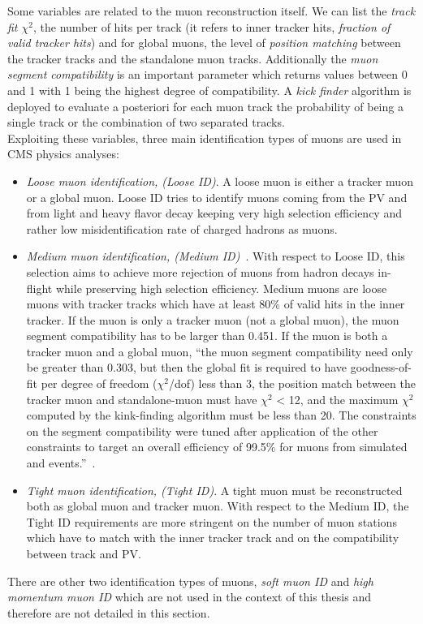 Some variables are related to the muon reconstruction itself. We can
list the \emph{track fit $\chi^2$}, the number of hits per track (it refers
to inner tracker hits, \emph{fraction of valid tracker hits}) and for global muons, the
level of \emph{position matching} between the tracker tracks and the standalone muon
tracks. Additionally the \emph{muon segment
compatibility} is an important parameter which returns values between 0
and 1 with 1 being the highest degree of compatibility. A \emph{kick
  finder} algorithm is deployed to evaluate a posteriori for each muon
track the
probability of being a single track or the combination of two
separated tracks.  \\
Exploiting these variables, three main identification types of muons
are used in CMS physics analyses:
\begin{itemize}
\setlength\itemsep{-0.2em}
\item \emph{Loose muon identification, (Loose ID)}. A loose muon is either a
  tracker muon or a global muon. Loose ID tries to identify muons
  coming from the PV and from light and heavy flavor decay keeping
  very high selection efficiency and rather low misidentification rate
  of charged hadrons as muons. 
\item \emph{Medium muon identification, (Medium
    ID)}~\cite{PetruccianiBotta}. With
  respect to Loose ID, this selection aims to achieve more rejection	
of muons from hadron decays in-flight while preserving
high selection efficiency. Medium muons are loose muons with tracker
tracks which have at least 80\% of valid hits in the inner tracker. 
If the muon is only a tracker muon (not a global muon), the muon
segment compatibility has to be larger than
0.451. If the muon is both a tracker muon and a global muon, ``the
muon segment compatibility need only be greater than 0.303, but then the global fit
is required to have goodness-of-fit per degree of freedom ($\chi^2$/dof) less than 3, the
position match between the tracker muon and standalone-muon must have $\chi^2$ < 12,
and the maximum $\chi^2$ computed by the kink-finding algorithm must be less than 20.
The constraints on the segment compatibility were tuned after application of the
other constraints to target an overall efficiency of 99.5\% for muons from simulated
\PW and \PZ events.''~\cite{Sirunyan_2018_muon}.
\item \emph{Tight muon identification, (Tight ID)}. A tight muon must
  be reconstructed both as global muon and tracker muon. With respect
  to the Medium ID, the Tight ID requirements are more stringent on
  the number of muon stations which have to match with the inner
  tracker track and on the compatibility between track and PV. 
\end{itemize}
There are other two identification types of muons, \emph{soft muon ID}
and \emph{high momentum muon ID} which are not used in the context of
this thesis and therefore are not detailed in this section. 



